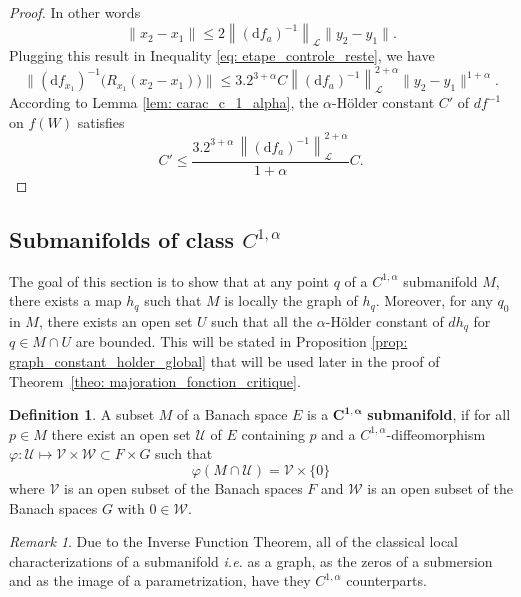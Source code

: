 \documentclass[11pt,reqno,a4paper]{article}%
\theoremstyle{definition}
\newtheorem{definition}{Definition}[section]
\theoremstyle{remark}
\newtheorem{remark}{Remark}[section]
\renewcommand{\leq}{\leqslant}
\newcommand{\opnorm}[1]{{\left\| #1 \right\|}_{\mathcal{L}}}
\renewcommand{\d}{\mathrm{d}}
\renewcommand{\d}{\mathrm{d}}
\begin{document}
\begin{proof}
    In other words
    $$\|x_2-x_1\| \leq 2  \opnorm{ (\d f_a)^{-1} } \|y_2-y_1\|.$$ 
    Plugging this result in Inequality \eqref{eq: etape_controle_reste}, we have
     \[ \| (\d f_{x_1})^{-1}\big(R_{x_1}(x_2-x_1)\big) \| \leq 3. 2^{3 + \alpha} C   \opnorm{(\d f_a)^{-1}}^{2+\alpha}  \|y_2-y_1\|^{1+\alpha}.\]
     According to  Lemma \ref{lem: carac_c_1_alpha}, the $\alpha$-Hölder constant  $C'$ of $df^{-1}$ on $f(W)$ satisfies
     \[ C' \leq \frac{ 3.2^{3 + \alpha} \, \opnorm{(\d f_a)^{-1}}^{2+\alpha}}{1 + \alpha} C .\]
\end{proof}


\subsection{Submanifolds of class \texorpdfstring{$C^{1,\alpha}$}{C(1,a)}}

The goal of this section is to show that at any point $q$ of a $C^{1,\alpha}$ submanifold $M$, there exists a map $h_q$ such that $M$ is locally the graph of $h_q$. Moreover, for any $q_0$ in $M$, there exists an open set $U$ such that all the $\alpha$-Hölder constant of $d h_q$ for $q \in M \cap U$ are bounded. This will be stated in Proposition \ref {prop: graph_constant_holder_global} that will be used later in the proof of Theorem~\ref{theo: majoration_fonction_critique}.

\begin{definition}
    A subset $M$ of a Banach space $E$ is a $\boldsymbol{C^{1,\alpha}}$ \textbf{submanifold}, if for all $p \in M$ there exist an open set $\mathcal{U}$ of $E$ containing $p$ and a $C^{1,\alpha}$-diffeomorphism $\varphi : \mathcal{U} \mapsto \mathcal{V} \times \mathcal{W} \subset F \times G$ such that 
    $$\varphi(M \cap \mathcal{U}) = \mathcal{V} \times \{ 0 \}$$
    where $\mathcal{V}$ is an open subset of the Banach spaces $F$ and $\mathcal{W}$ is an open subset of the Banach spaces $G$ with $0 \in \mathcal{W}$.
\end{definition}

\begin{remark}
    Due to the Inverse Function Theorem, all of the classical local characterizations of a submanifold \textit{i.e.} as a graph, as the zeros of a submersion and as the image of a parametrization, have they $C^{1,\alpha}$ counterparts.
\end{remark}
\end{document}
